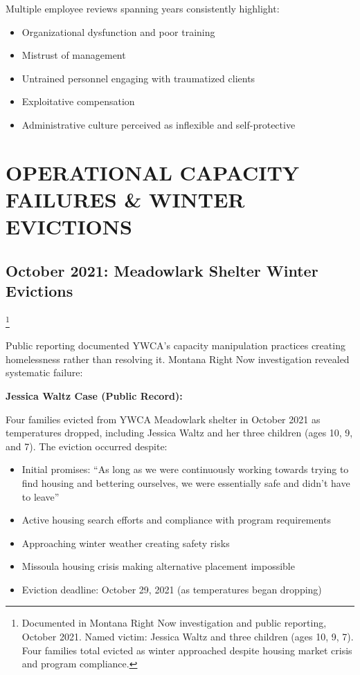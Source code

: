 \documentclass[12pt,oneside]{article}
\begin{document}
Multiple employee reviews spanning years consistently highlight:
\begin{itemize}
\item Organizational dysfunction and poor training
\item Mistrust of management
\item Untrained personnel engaging with traumatized clients
\item Exploitative compensation
\item Administrative culture perceived as inflexible and self-protective
\end{itemize}


\section*{OPERATIONAL CAPACITY FAILURES \& WINTER EVICTIONS}

\subsection*{October 2021: Meadowlark Shelter Winter Evictions}\footnote{Documented in Montana Right Now investigation and public reporting, October 2021. Named victim: Jessica Waltz and three children (ages 10, 9, 7). Four families total evicted as winter approached despite housing market crisis and program compliance.}

Public reporting documented YWCA's capacity manipulation practices creating homelessness rather than resolving it. Montana Right Now investigation revealed systematic failure:

\textbf{Jessica Waltz Case (Public Record):}

Four families evicted from YWCA Meadowlark shelter in October 2021 as temperatures dropped, including Jessica Waltz and her three children (ages 10, 9, and 7). The eviction occurred despite:

\begin{itemize}
\item Initial promises: ``As long as we were continuously working towards trying to find housing and bettering ourselves, we were essentially safe and didn't have to leave''
\item Active housing search efforts and compliance with program requirements
\item Approaching winter weather creating safety risks
\item Missoula housing crisis making alternative placement impossible
\item Eviction deadline: October 29, 2021 (as temperatures began dropping)
\end{itemize}
\end{document}
